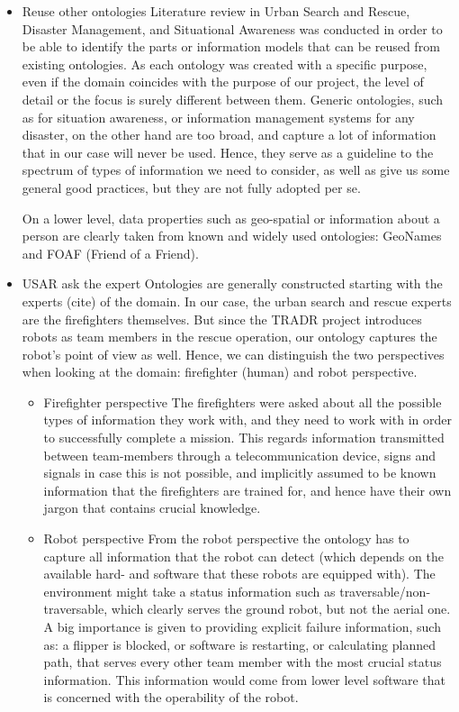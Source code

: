 \begin{itemize}
\item Reuse other ontologies
Literature review in Urban Search and Rescue, Disaster Management, and Situational Awareness was conducted in order to be able to identify the parts or information models that can be reused from existing ontologies. As each ontology was created with a specific purpose, even if the domain coincides with the purpose of our project, the level of detail or the focus is surely different between them. Generic ontologies, such as for situation awareness, or information management systems for any disaster, on the other hand are too broad, and capture a lot of information that in our case will never be used. Hence, they serve as a guideline to the spectrum of types of information we need to consider, as well as give us some general good practices, but they are not fully adopted per se. 

On a lower level, data properties such as geo-spatial or information about a person are clearly taken from known and widely used ontologies: GeoNames and FOAF (Friend of a Friend). 


\item USAR ask the expert 
Ontologies are generally constructed starting with the experts (cite) of the domain. In our case, the urban search and rescue experts are the firefighters themselves. But since the TRADR project introduces robots as team members in the rescue operation, our ontology captures the robot's point of view as well. Hence, we can distinguish the two perspectives when looking at the domain: firefighter (human) and robot perspective.
\begin{itemize}
\item Firefighter perspective
The firefighters were asked about all the possible types of information they work with, and they need to work with in order to successfully complete a mission. This regards information transmitted between team-members through a telecommunication device, signs and signals in case this is not possible, and implicitly assumed to be known information that the firefighters are trained for, and hence have their own jargon that contains crucial knowledge.

\item Robot perspective
From the robot perspective the ontology has to capture all information that the robot can detect (which depends on the available hard- and software that these robots are equipped with). The environment might take a status information such as traversable/non-traversable, which clearly serves the ground robot, but not the aerial one. A big importance is given to providing explicit failure information, such as: a flipper is blocked, or software is restarting, or calculating planned path, that serves every other team member with the most crucial status information. This information would come from lower level software that is concerned with the operability of the robot.


\end{itemize}
\end{itemize}
